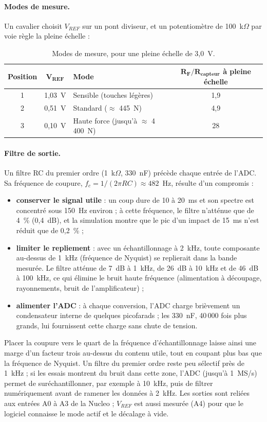 \paragraph{Modes de mesure.} Un cavalier choisit $V_{REF}$ sur un pont diviseur, et un potentiomètre de 100~k$\Omega$ par voie règle la pleine échelle :

\begin{table}[H]
\centering
\begin{tabular}{@{}cclc@{}}
\toprule
\textbf{Position} & $\boldsymbol{V_{REF}}$ & \textbf{Mode} & $\boldsymbol{R_F / R_{capteur}}$ \textbf{à pleine échelle} \\
\midrule
1 & 1,03~V & Sensible (touches légères) & 1,9 \\
2 & 0,51~V & Standard ($\approx$ 445~N) & 4,9 \\
3 & 0,10~V & Haute force (jusqu'à $\approx$ 4\,400~N) & 28 \\
\bottomrule
\end{tabular}
\caption{Modes de mesure, pour une pleine échelle de 3,0~V.}
\end{table}

\paragraph{Filtre de sortie.} Un filtre RC du premier ordre (1~k$\Omega$, 330~nF) précède chaque entrée de l'ADC. Sa fréquence de coupure, $f_c = 1/(2\pi RC) \approx 482$~Hz, résulte d'un compromis :
\begin{itemize}
  \item \textbf{conserver le signal utile} : un coup dure de 10 à 20~ms et son spectre est concentré sous 150~Hz environ ; à cette fréquence, le filtre n'atténue que de 4~\% (0,4~dB), et la simulation montre que le pic d'un impact de 15~ms n'est réduit que de 0,2~\% ;
  \item \textbf{limiter le repliement} : avec un échantillonnage à 2~kHz, toute composante au-dessus de 1~kHz (fréquence de Nyquist) se replierait dans la bande mesurée. Le filtre atténue de 7~dB à 1~kHz, de 26~dB à 10~kHz et de 46~dB à 100~kHz, ce qui élimine le bruit haute fréquence (alimentation à découpage, rayonnements, bruit de l'amplificateur) ;
  \item \textbf{alimenter l'ADC} : à chaque conversion, l'ADC charge brièvement un condensateur interne de quelques picofarads ; les 330~nF, 40\,000 fois plus grands, lui fournissent cette charge sans chute de tension.
\end{itemize}
Placer la coupure vers le quart de la fréquence d'échantillonnage laisse ainsi une marge d'un facteur trois au-dessus du contenu utile, tout en coupant plus bas que la fréquence de Nyquist. Un filtre du premier ordre reste peu sélectif près de 1~kHz ; si les essais montrent du bruit dans cette zone, l'ADC (jusqu'à 1~MS/s) permet de suréchantillonner, par exemple à 10~kHz, puis de filtrer numériquement avant de ramener les données à 2~kHz. Les sorties sont reliées aux entrées A0 à A3 de la Nucleo ; $V_{REF}$ est aussi mesurée (A4) pour que le logiciel connaisse le mode actif et le décalage à vide.

